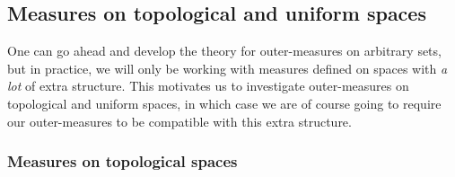 \subsection{Measures on topological and uniform spaces}

One can go ahead and develop the theory for outer-measures on arbitrary sets, but in practice, we will only be working with measures defined on spaces with \emph{a lot} of extra structure.  This motivates us to investigate outer-measures on topological and uniform spaces, in which case we are of course going to require our outer-measures to be compatible with this extra structure.

\subsubsection{Measures on topological spaces}

